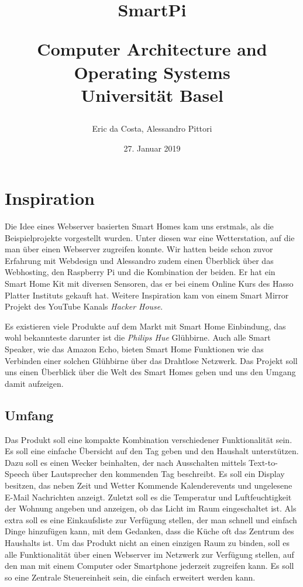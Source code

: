 \documentclass[11pt,a4paper]{article}
\title{SmartPi\\ \begin{large} Computer Architecture and Operating Systems\\ Universität Basel\end{large}}
\author{Eric da Costa, Alessandro Pittori}
\date{27. Januar 2019}
\begin{document}
\maketitle

\newpage

\section{Inspiration}
Die Idee eines Webserver basierten Smart Homes kam uns erstmals, als die Beispielprojekte vorgestellt wurden. Unter diesen war eine Wetterstation, auf die man über einen Webserver zugreifen konnte. Wir hatten beide schon zuvor Erfahrung mit Webdesign und Alessandro zudem einen Überblick über das Webhosting, den Raspberry Pi und die Kombination der beiden. Er hat ein Smart Home Kit mit diversen Sensoren, das er bei einem Online Kurs des Hasso Platter Instituts gekauft hat. Weitere Inspiration kam von einem Smart Mirror Projekt des YouTube Kanals \textit{Hacker House}.

Es existieren viele Produkte auf dem Markt mit Smart Home Einbindung, das wohl bekannteste darunter ist die \textit{Philips Hue} Glühbirne. Auch alle Smart Speaker, wie das Amazon Echo, bieten Smart Home Funktionen wie das Verbinden einer solchen Glühbirne über das Drahtlose Netzwerk. Das Projekt soll uns einen Überblick über die Welt des Smart Homes geben und uns den Umgang damit aufzeigen.

\subsection{Umfang}
Das Produkt soll eine kompakte Kombination verschiedener Funktionalität sein. Es soll eine einfache Übersicht auf den Tag geben und den Haushalt unterstützen.
Dazu soll es einen Wecker beinhalten, der nach Ausschalten mittels Text-to-Speech über Lautsprecher den kommenden Tag beschreibt. Es soll ein Display besitzen, das neben Zeit und Wetter Kommende Kalenderevents und ungelesene E-Mail Nachrichten anzeigt. Zuletzt soll es die Temperatur und Luftfeuchtigkeit der Wohnung angeben und anzeigen, ob das Licht im Raum eingeschaltet ist. Als extra soll es eine Einkaufsliste zur Verfügung stellen, der man schnell und einfach Dinge hinzufügen kann, mit dem Gedanken, dass die Küche oft das Zentrum des Haushalts ist. Um das Produkt nicht an einen einzigen Raum zu binden, soll es alle Funktionalität über einen Webserver im Netzwerk zur Verfügung stellen, auf den man mit einem Computer oder Smartphone jederzeit zugreifen kann. Es soll so eine Zentrale Steuereinheit sein, die einfach erweitert werden kann.
\end{document}

